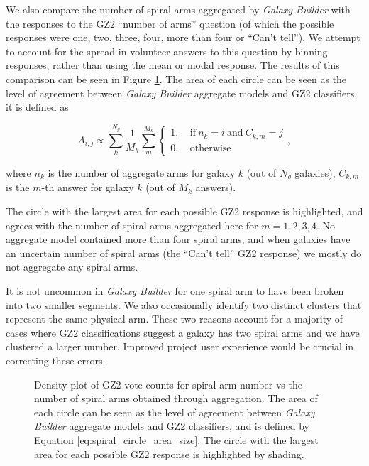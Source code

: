 \documentclass[../main.tex]{subfiles}
\begin{document}
We also compare the number of spiral arms aggregated by \textit{Galaxy Builder} with the responses to the GZ2 ``number of arms'' question (of which the possible responses were one, two, three, four, more than four or ``Can't tell''). We attempt to account for the spread in volunteer answers to this question by binning responses, rather than using the mean or modal response. The results of this comparison can be seen in Figure \ref{fig:n_spirals_comparison}. The area of each circle can be seen as the level of agreement between \textit{Galaxy Builder} aggregate models and GZ2 classifiers, it is defined as

\begin{equation}
  \label{eq:spiral_circle_area_size}
  A_{i, j} \propto \sum_{k}^{N_g}\frac{1}{M_k}\sum_{m}^{M_k}
  \begin{cases}
    1,&\ \mathrm{if}\ n_k = i\ \mathrm{and}\ C_{k, m} = j\\
    0,&\ \mathrm{otherwise}
  \end{cases},
\end{equation}

where $n_k$ is the number of aggregate arms for galaxy $k$ (out of $N_g$ galaxies), $C_{k, m}$ is the $m$-th answer for galaxy $k$ (out of $M_k$ answers).

The circle with the largest area for each possible GZ2 response is highlighted, and agrees with the number of spiral arms aggregated here for $m=1, 2, 3, 4$. No aggregate model contained more than four spiral arms, and when galaxies have an uncertain number of spiral arms (the ``Can't tell'' GZ2 response) we mostly do not aggregate any spiral arms.

It is not uncommon in \textit{Galaxy Builder} for one spiral arm to have been broken into two smaller segments. We also occasionally identify two distinct clusters that represent the same physical arm. These two reasons account for a majority of cases where GZ2 classifications suggest a galaxy has two spiral arms and we have clustered a larger number. Improved project user experience would be crucial in correcting these errors.

\begin{figure}
  \caption{Density plot of GZ2 vote counts for spiral arm number vs the number of spiral arms obtained through aggregation. The area of each circle can be seen as the level of agreement between \textit{Galaxy Builder} aggregate models and GZ2 classifiers, and is defined by Equation \ref{eq:spiral_circle_area_size}. The circle with the largest area for each possible GZ2 response is highlighted by shading.}
  \label{fig:n_spirals_comparison}
\end{figure}
\end{document}
